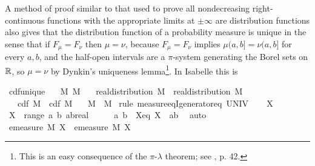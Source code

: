 \documentclass[leqno]{article}
\theoremstyle{definition}
\begin{document}
A method of proof similar to that used to prove all nondecreasing right-continuous functions with the appropriate limits at $\pm \infty$ are distribution functions also gives that the distribution function of a probability measure is unique in the sense that if $F_\mu = F_\nu$ then $\mu = \nu$, because $F_\mu = F_\nu$ implies $\mu (a,b] = \nu (a,b]$ for every $a,b$, and the half-open intervals are a $\pi$-system generating the Borel sets on $\mathbb{R}$, so $\mu = \nu$ by Dynkin's uniqueness lemma\footnote{This is an easy consequence of the $\pi$-$\lambda$ theorem; see \cite{billingsley}, p. 42.}. In Isabelle this is

\medskip

\begin{isabellebody}
\isamarkupfalse%
\ cdf{\isacharunderscore}unique{\isacharcolon}\isanewline
\ \ \ M{}\ M{}\isanewline
\ \ \ {\isachardoublequoteopen}real{\isacharunderscore}distribution\ M{}{\isachardoublequoteclose}\ \ {\isachardoublequoteopen}real{\isacharunderscore}distribution\ M{}{\isachardoublequoteclose}\isanewline
\ \ \ {\isachardoublequoteopen}cdf\ M{}\ {\isacharequal}\ cdf\ M{}{\isachardoublequoteclose}\isanewline
\ \ \ {\isachardoublequoteopen}M{}\ {\isacharequal}\ M{}{\isachardoublequoteclose}\isanewline
{}\isamarkupfalse%
\ {\isacharparenleft}rule\ measure{\isacharunderscore}eqI{\isacharunderscore}generator{\isacharunderscore}eq{\isacharbrackleft}\ {\isasymOmega}{\isacharequal}UNIV{\isacharbrackright}{\isacharparenright}\isanewline
\ \ \isamarkupfalse%
\ X\ \isamarkupfalse%
\ {\isachardoublequoteopen}X\ {\isasymin}\ range\ {\isacharparenleft}{\isasymlambda}{\isacharparenleft}a{\isacharcomma}\ b{\isacharparenright}{\isachardot}\ {\isacharbraceleft}a{\isacharless}{\isachardot}{\isachardot}b{\isacharcolon}{\isacharcolon}real{\isacharbraceright}{\isacharparenright}{\isachardoublequoteclose}\isanewline
\ \ \isamarkupfalse%
\ \isamarkupfalse%
\ a\ b\ \ Xeq{\isacharcolon}\ {\isachardoublequoteopen}X\ {\isacharequal}\ {\isacharbraceleft}a{\isacharless}{\isachardot}{\isachardot}b{\isacharbraceright}{\isachardoublequoteclose}\ \isamarkupfalse%
\ auto\isanewline
\ \ \isamarkupfalse%
\ \isamarkupfalse%
\ {\isachardoublequoteopen}emeasure\ M{}\ X\ {\isacharequal}\ emeasure\ M{}\ X{\isachardoublequoteclose}\isanewline

\end{isabellebody}
\end{document}
